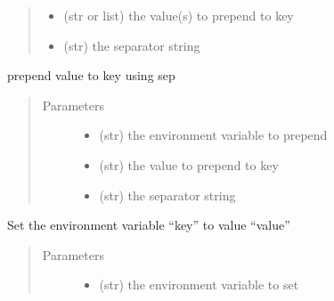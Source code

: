 \documentclass[a4paper,10pt,english]{sphinxmanual}
\begin{document}
\begin{fulllineitems}
\begin{fulllineitems}
\begin{quote}
\begin{description}
\begin{itemize}
\item {} 
 \textendash{} (str or list) the value(s) to prepend to key

\item {} 
 \textendash{} (str) the separator string

\end{itemize}

\end{description}\end{quote}

\end{fulllineitems}


\begin{fulllineitems}
\label{\detokenize{apidoc_src/src:src.fileEnviron.LauncherFileEnviron.prepend_value}}
prepend value to key using sep
\begin{quote}\begin{description}
\item[{Parameters}] \leavevmode\begin{itemize}
\item {} 
 \textendash{} (str) the environment variable to prepend

\item {} 
 \textendash{} (str) the value to prepend to key

\item {} 
 \textendash{} (str) the separator string

\end{itemize}

\end{description}\end{quote}

\end{fulllineitems}


\begin{fulllineitems}
\label{\detokenize{apidoc_src/src:src.fileEnviron.LauncherFileEnviron.set}}
Set the environment variable “key” to value “value”
\begin{quote}\begin{description}
\item[{Parameters}] \leavevmode\begin{itemize}
\item {} 
 \textendash{} (str) the environment variable to set


\end{itemize}
\end{description}
\end{quote}
\end{fulllineitems}
\end{fulllineitems}
\end{document}
